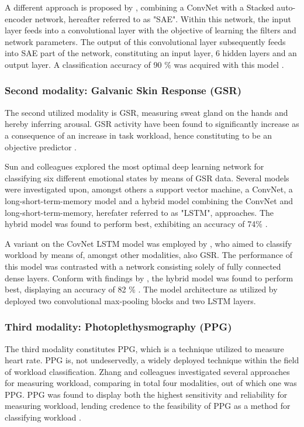 \documentclass[12pt]{article}
\begin{document}
A different approach is proposed by , combining a ConvNet with a Stacked auto-encoder network, hereafter referred to as "SAE". Within this network, the input layer feeds into a convolutional layer with the objective of learning the filters and network parameters. The output of this convolutional layer subsequently feeds into SAE part of the network, constituting an input layer, 6 hidden layers and an output layer. A classification accuracy of 90 \% was acquired with this model \cite{tabar2016novel} . 

\subsubsection{Second modality: Galvanic Skin Response (GSR)}
The second utilized modality is GSR, measuring sweat gland on the hands and hereby inferring arousal. GSR activity have been found to significantly increase as a consequence of an increase in task workload, hence constituting to be an objective predictor \cite{shi2007galvanic}. 

Sun and colleagues explored the most optimal deep learning network for classifying six different emotional states by means of GSR data. Several models were investigated upon, amongst others a support vector machine, a ConvNet, a long-short-term-memory model and a hybrid model combining the ConvNet and long-short-term-memory, herefater referred to as "LSTM", approaches. The hybrid model was found to perform best, exhibiting an accuracy of 74\% \cite{sun2019hybrid}. 

A variant on the CovNet LSTM model was employed by , who aimed to classify workload by means of, amongst other modalities, also GSR. The performance of this model was contrasted with a network consisting solely of fully connected dense layers. Conform with findings by  , the hybrid model was found to perform best, displaying an accuracy of 82 \% \cite{dolmans2020perceived}. The model architecture as utilized by  deployed two convolutional max-pooling blocks and two LSTM layers.

\subsubsection{Third modality: Photoplethysmography (PPG)}
The third modality constitutes PPG, which is a technique utilized to measure heart rate. PPG is, not undeservedly, a widely deployed technique within the field of workload classification. Zhang and colleagues investigated several approaches for measuring workload, comparing in total four modalities, out of which one was PPG. PPG was found to display both the highest sensitivity and reliability for measuring workload, lending credence to the feasibility of PPG as a method for classifying workload \cite{zhang2018evaluating}. 
\end{document}
